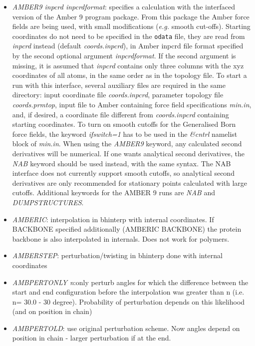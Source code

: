 \documentclass[12pt,a4paper,dvips]{article}
\begin{document}
\begin{itemize}
\item {\it AMBER9 inpcrd inpcrdformat\/}: specifies a calculation with the interfaced 
version of the Amber 9 program package. From this package the Amber force fields 
are being used, with small modifications ({\it e.g.} smooth cut-offs). 
Starting coordinates do not need to be specified in the {\tt odata} file, they
are read from {\it inpcrd} instead (default {\it coords.inpcrd}), in Amber inpcrd 
file format specified by the second optional argument {\it inpcrdformat}.
If the second argument is missing, it is assumed that {\it inpcrd} contains
only three columns with the xyz coordinates of all atoms, in the same order 
as in the topology file. To start a run with this interface, 
several auxiliary files are required in the same directory: input coordinate file
{\it coords.inpcrd}, parameter topology file {\it coords.prmtop}, 
input file to Amber containing force field specifications {\it min.in}, and, if 
desired, a coordinate file different from {\it coords.inpcrd} containing 
starting coordinates.
To turn on smooth cutoffs for the Generalised Born force fields, the keyword 
{\it ifswitch=1} has to be used in the {\it \&cntrl} namelist block of {\it min.in}.
When using the {\it AMBER9} keyword, any calculated second derivatives will be 
numerical. If one wants analytical second derivatives, the {\it NAB} keyword 
should be used instead, with the same syntax. The NAB interface does not 
currently support smooth cutoffs, so analytical second derivatives are only 
recommended for stationary points calculated with large cutoffs.
Additional keywords for the AMBER 9 runs are {\it NAB} and {\it DUMPSTRUCTURES}.

\item{\it AMBERIC}: interpolation in bhinterp with internal coordinates. If BACKBONE specified additionally (AMBERIC BACKBONE) the protein backbone is also interpolated in internals. Does not work for polymers.

\item{\it AMBERSTEP}: perturbation/twisting in bhinterp done with internal coordinates

\item{\it AMBPERTONLY n}:only perturb angles for which the difference between the start and end configuration before the interpolation was greater than n (i.e. n= 30.0 - 30 degree). Probability of perturbation depends on this likelihood (and on position in chain)

\item{\it AMBPERTOLD}: use original perturbation scheme. Now angles depend on position in chain - larger perturbation if at the end.


\end{itemize}
\end{document}
